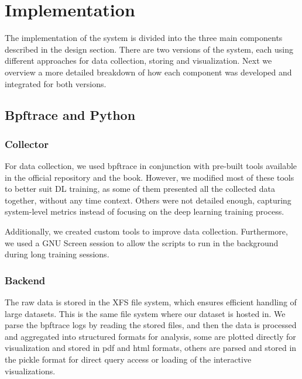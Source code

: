 \documentclass[conference]{IEEEtran}
\begin{document}
\section{Implementation}
The implementation of the system is divided into the three main components described in the design section.
There are two versions of the system, each using different approaches for data collection, storing and visualization.
Next we overview a more detailed breakdown of how each component was developed and integrated for both versions.

\subsection{Bpftrace and Python}

\subsubsection{Collector}

For data collection, we used bpftrace\cite{bpftrace} in conjunction with pre-built tools available in the official repository and the book\cite{bgreggBook}. 
However, we modified most of these tools to better suit DL training, as some of them presented all the collected data together, without any time context.
Others were not detailed enough, capturing system-level metrics instead of focusing on the deep learning training process. 

Additionally, we created custom tools to improve data collection. 
Furthermore, we used a GNU Screen \cite{screen} session to allow the scripts to run in the background during long training sessions.

\subsubsection{Backend}
The raw data is stored in the XFS file system, which ensures efficient handling of large datasets. This is the same file system where our dataset is hosted in. 
We parse the bpftrace\cite{bpftrace} logs by reading the stored files, and then the data is processed and aggregated into structured formats for analysis,
some are plotted directly for visualization and stored in pdf and html formats, others are parsed and stored in the pickle format for direct query access or loading of the interactive visualizations.
\end{document}
